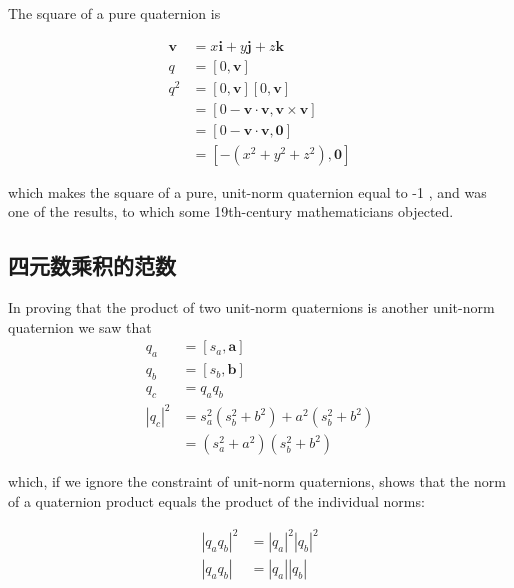 The square of a pure quaternion is

$$
    \begin{aligned}
        \mathbf{v} & =x \mathbf{i}+y \mathbf{j}+z \mathbf{k}                        \\
        q          & =[0, \mathbf{v}]                                               \\
        q^{2}      & =[0, \mathbf{v}][0, \mathbf{v}]                                \\
                   & =[0-\mathbf{v} \cdot \mathbf{v}, \mathbf{v} \times \mathbf{v}] \\
                   & =[0-\mathbf{v} \cdot \mathbf{v}, \mathbf{0}]                   \\
                   & =\left[-\left(x^{2}+y^{2}+z^{2}\right), \mathbf{0}\right]
    \end{aligned}
$$

which makes the square of a pure, unit-norm quaternion equal to -1 , and was one of the results, to which some 19th-century mathematicians objected.

\subsection{四元数乘积的范数}
In proving that the product of two unit-norm quaternions is another unit-norm quaternion we saw that
$$
    \begin{aligned}
        q_{a}                  & =\left[s_{a}, \mathbf{a}\right]                                          \\
        q_{b}                  & =\left[s_{b}, \mathbf{b}\right]                                          \\
        q_{c}                  & =q_{a} q_{b}                                                             \\
        \left|q_{c}\right|^{2} & =s_{a}^{2}\left(s_{b}^{2}+b^{2}\right)+a^{2}\left(s_{b}^{2}+b^{2}\right) \\
                               & =\left(s_{a}^{2}+a^{2}\right)\left(s_{b}^{2}+b^{2}\right)
    \end{aligned}
$$

which, if we ignore the constraint of unit-norm quaternions, shows that the norm of a quaternion product equals the product of the individual norms:

$$
    \begin{aligned}
        \left|q_{a} q_{b}\right|^{2} & =\left|q_{a}\right|^{2}\left|q_{b}\right|^{2} \\
        \left|q_{a} q_{b}\right|     & =\left|q_{a}\right|\left|q_{b}\right|
    \end{aligned}
$$

